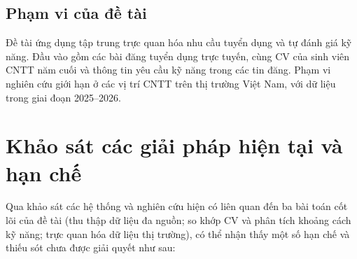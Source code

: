 \subsection{Phạm vi của đề tài}

Đề tài ứng dụng tập trung trực quan hóa nhu cầu tuyển dụng và tự đánh giá kỹ năng. Đầu vào gồm các bài đăng tuyển dụng trực tuyến, cùng CV của sinh viên CNTT năm cuối và thông tin yêu cầu kỹ năng trong các tin đăng. Phạm vi nghiên cứu giới hạn ở các vị trí CNTT trên thị trường Việt Nam, với dữ liệu trong giai đoạn 2025--2026.

\section{Khảo sát các giải pháp hiện tại và hạn chế}

Qua khảo sát các hệ thống và nghiên cứu hiện có liên quan đến ba bài toán cốt lõi của đề tài (thu thập dữ liệu đa nguồn; so khớp CV và phân tích khoảng cách kỹ năng; trực quan hóa dữ liệu thị trường), có thể nhận thấy một số hạn chế và thiếu sót chưa được giải quyết như sau:


